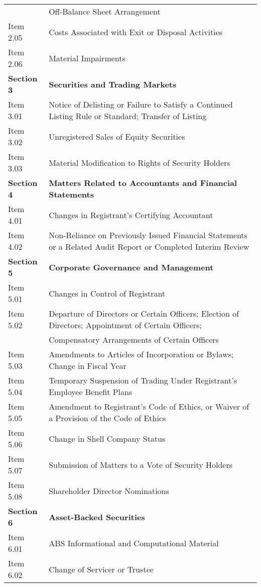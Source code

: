 \begin{table}[H]
\begin{tabular}{ll}
              & Off-Balance Sheet Arrangement \\
    Item 2.05 & Costs Associated with Exit or Disposal Activities \\
    Item 2.06 & Material Impairments \\
    \textbf{Section 3} & \textbf{Securities and Trading Markets} \\
    Item 3.01 & Notice of Delisting or Failure to Satisfy a Continued Listing Rule or Standard; Transfer of Listing \\
    Item 3.02 & Unregistered Sales of Equity Securities \\
    Item 3.03 & Material Modification to Rights of Security Holders \\
    \textbf{Section 4} & \textbf{Matters Related to Accountants and Financial Statements} \\
    Item 4.01 & Changes in Registrant's Certifying Accountant \\
    Item 4.02 & Non-Reliance on Previously Issued Financial Statements or a Related Audit Report or Completed Interim Review \\
    \textbf{Section 5} & \textbf{Corporate Governance and Management} \\
    Item 5.01 & Changes in Control of Registrant \\
    Item 5.02 & Departure of Directors or Certain Officers; Election of Directors; Appointment of Certain Officers; \\
              & Compensatory Arrangements of Certain Officers \\
    Item 5.03 & Amendments to Articles of Incorporation or Bylaws; Change in Fiscal Year \\
    Item 5.04 & Temporary Suspension of Trading Under Registrant's Employee Benefit Plans \\
    Item 5.05 & Amendment to Registrant's Code of Ethics, or Waiver of a Provision of the Code of Ethics \\
    Item 5.06 & Change in Shell Company Status \\
    Item 5.07 & Submission of Matters to a Vote of Security Holders \\
    Item 5.08 & Shareholder Director Nominations \\
    \textbf{Section 6} & \textbf{Asset-Backed Securities} \\
    Item 6.01 & ABS Informational and Computational Material \\
    Item 6.02 & Change of Servicer or Trustee \\

\end{tabular}
\end{table}
